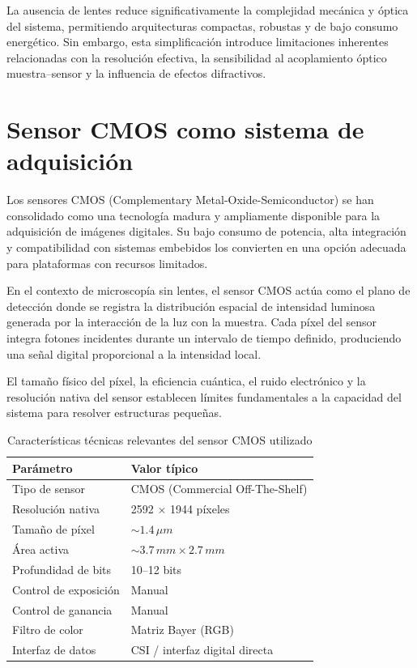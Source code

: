 La ausencia de lentes reduce significativamente la complejidad mecánica y óptica del sistema, permitiendo arquitecturas compactas, robustas y de bajo consumo energético. Sin embargo, esta simplificación introduce limitaciones inherentes relacionadas con la resolución efectiva, la sensibilidad al acoplamiento óptico muestra–sensor y la influencia de efectos difractivos.

\section{Sensor CMOS como sistema de adquisición}

Los sensores CMOS (Complementary Metal-Oxide-Semiconductor) se han consolidado como una tecnología madura y ampliamente disponible para la adquisición de imágenes digitales. Su bajo consumo de potencia, alta integración y compatibilidad con sistemas embebidos los convierten en una opción adecuada para plataformas con recursos limitados.

En el contexto de microscopía sin lentes, el sensor CMOS actúa como el plano de detección donde se registra la distribución espacial de intensidad luminosa generada por la interacción de la luz con la muestra. Cada píxel del sensor integra fotones incidentes durante un intervalo de tiempo definido, produciendo una señal digital proporcional a la intensidad local.

El tamaño físico del píxel, la eficiencia cuántica, el ruido electrónico y la resolución nativa del sensor establecen límites fundamentales a la capacidad del sistema para resolver estructuras pequeñas.

\begin{table}[H]
\centering
\caption{Características técnicas relevantes del sensor CMOS utilizado}
\begin{tabular}{|l|l|}
\hline
\textbf{Parámetro} & \textbf{Valor típico} \\
\hline
Tipo de sensor & CMOS (Commercial Off-The-Shelf) \\
Resolución nativa & 2592 × 1944 píxeles \\
Tamaño de píxel & $\sim 1.4\,\mu m$ \\
Área activa & $\sim 3.7\,mm \times 2.7\,mm$ \\
Profundidad de bits & 10–12 bits \\
Control de exposición & Manual \\
Control de ganancia & Manual \\
Filtro de color & Matriz Bayer (RGB) \\
Interfaz de datos & CSI / interfaz digital directa \\
\hline
\end{tabular}
\end{table}

